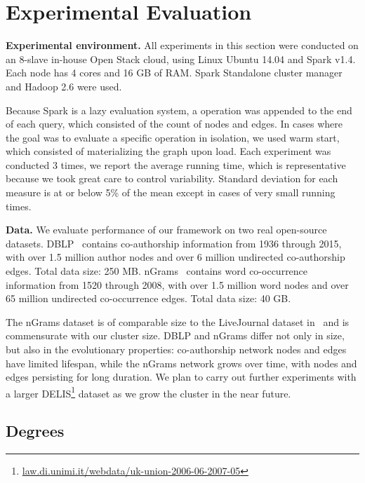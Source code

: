 \section{Experimental Evaluation}
\label{sec:exp}

{\bf Experimental environment.} All experiments in this section were
conducted on an 8-slave in-house Open Stack cloud, using Linux Ubuntu
14.04 and Spark v1.4.  Each node has 4 cores and 16 GB of RAM.  Spark
Standalone cluster manager and Hadoop 2.6 were used.

Because Spark is a lazy evaluation system, a 
operation was appended to the end of each query, which consisted of
the count of nodes and edges.  In cases where the goal was to evaluate
a specific operation in isolation, we used warm start, which consisted
of materializing the graph upon load.  Each experiment was conducted 3
times, we report the average running time, which is representative
because we took great care to control variability.  Standard deviation
for each measure is at or below 5\% of the mean except in cases of
very small running times.

{\bf Data.}  We evaluate performance of our framework on two real
open-source datasets.
DBLP~\cite{dblp} contains co-authorship information from 1936 through
2015, with over 1.5 million author nodes and over 6 million undirected
co-authorship edges.  Total data size: 250 MB.
%
nGrams~\cite{nGrams} contains word co-occurrence information from 1520
through 2008, with over 1.5 million word nodes and over 65 million
undirected co-occurrence edges.  Total data size: 40 GB.  

The nGrams dataset is of comparable size to the LiveJournal dataset
in~\cite{Xin2013} and is commensurate with our cluster size.  DBLP and
nGrams differ not only in size, but also in the evolutionary
properties: co-authorship network nodes and edges have limited
lifespan, while the nGrams network grows over time, with nodes and
edges persisting for long duration.    We plan to
carry out further experiments with a larger
DELIS\footnote{\url{law.di.unimi.it/webdata/uk-union-2006-06-2007-05}}
dataset as we grow the cluster in the near future.

\subsection{Degrees}

